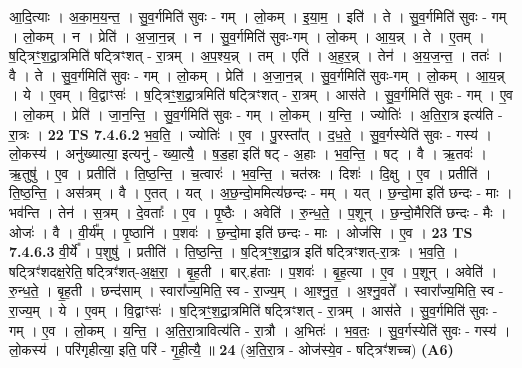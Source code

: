\documentclass[17pt]{extarticle}
\begin{document}
                  आ॒दि॒त्याः । अ॒का॒म॒य॒न्त॒ । सु॒व॒र्गमिति॑ सुवः - गम् । लो॒कम् । इ॒या॒म॒ । इति॑ । ते । सु॒व॒र्गमिति॑ सुवः - गम् । लो॒कम् । न । प्रेति॑ । अ॒जा॒न॒न्न् । न । सु॒व॒र्गमिति॑ सुवः-गम् । लो॒कम् । आ॒य॒न्न् । ते । ए॒तम् । ष॒ट्त्रिꣳ॒॒श॒द्रा॒त्रमिति॑ षट्त्रिꣳशत् - रा॒त्रम् । अ॒प॒श्य॒न्न् । तम् । एति॑ । अ॒ह॒र॒न्न् । तेन॑ । अ॒य॒ज॒न्त॒ । ततः॑ । वै । ते । सु॒व॒र्गमिति॑ सुवः - गम् । लो॒कम् । प्रेति॑ । अ॒जा॒न॒न्न् । सु॒व॒र्गमिति॑ सुवः-गम् । लो॒कम् । आ॒य॒न्न् । ये । ए॒वम् । वि॒द्वाꣳसः॑ । ष॒ट्त्रिꣳ॒॒श॒द्रा॒त्रमिति॑ षट्त्रिꣳशत् - रा॒त्रम् । आस॑ते । सु॒व॒र्गमिति॑ सुवः - गम् । ए॒व । लो॒कम् । प्रेति॑ । जा॒न॒न्ति॒ । सु॒व॒र्गमिति॑ सुवः - गम् । लो॒कम् । य॒न्ति॒ । ज्योतिः॑ । अ॒ति॒रा॒त्र इत्य॑ति - रा॒त्रः । \textbf{  22} \newline
                  \newline
                                \textbf{ TS 7.4.6.2} \newline
                  भ॒व॒ति॒ । ज्योतिः॑ । ए॒व । पु॒रस्ता᳚त् । द॒ध॒ते॒ । सु॒व॒र्गस्येति॑ सुवः - गस्य॑ । लो॒कस्य॑ । अनु॑ख्यात्या॒ इत्यनु॑ - ख्या॒त्यै॒ । ष॒ड॒हा इति॑ षट् - अ॒हाः । भ॒व॒न्ति॒ । षट् । वै । ऋ॒तवः॑ । ऋ॒तुषु॑ । ए॒व । प्रतीति॑ । ति॒ष्ठ॒न्ति॒ । च॒त्वारः॑ । भ॒व॒न्ति॒ । चत॑स्रः । दिशः॑ । दि॒क्षु । ए॒व । प्रतीति॑ । ति॒ष्ठ॒न्ति॒ । अस॑त्रम् । वै । ए॒तत् । यत् । अ॒छ॒न्दो॒ममित्य॑छन्दः - मम् । यत् । छ॒न्दो॒मा इति॑ छन्दः - माः । भव॑न्ति । तेन॑ । स॒त्रम् । दे॒वताः᳚ । ए॒व । पृ॒ष्ठैः । अवेति॑ । रु॒न्ध॒ते॒ । प॒शून् । छ॒न्दो॒मैरिति॑ छन्दः - मैः । ओजः॑ । वै । वी॒र्य᳚म् । पृ॒ष्ठानि॑ । प॒शवः॑ । छ॒न्दो॒मा इति॑ छन्दः - माः । ओज॑सि । ए॒व । \textbf{  23} \newline
                  \newline
                                \textbf{ TS 7.4.6.3} \newline
                  वी॒र्ये᳚ । प॒शुषु॑ । प्रतीति॑ । ति॒ष्ठ॒न्ति॒ । ष॒ट्त्रिꣳ॒॒श॒द्रा॒त्र इति॑ षट्त्रिꣳशत्-रा॒त्रः । भ॒व॒ति॒ । षट्त्रिꣳ॑शदक्ष॒रेति॒ षट्त्रिꣳ॑शत्-अ॒क्ष॒रा॒ । बृ॒ह॒ती । बार्.ह॑ताः । प॒शवः॑ । बृ॒ह॒त्या । ए॒व । प॒शून् । अवेति॑ । रु॒न्ध॒ते॒ । बृ॒ह॒ती । छन्द॑साम् । स्वारा᳚ज्य॒मिति॒ स्व - रा॒ज्य॒म् । आ॒श्नु॒त॒ । अ॒श्नु॒वते᳚ । स्वारा᳚ज्य॒मिति॒ स्व - रा॒ज्य॒म् । ये । ए॒वम् । वि॒द्वाꣳसः॑ । ष॒ट्त्रिꣳ॒॒श॒द्रा॒त्रमिति॑ षट्त्रिꣳशत् - रा॒त्रम् । आस॑ते । सु॒व॒र्गमिति॑ सुवः - गम् । ए॒व । लो॒कम् । य॒न्ति॒ । अ॒ति॒रा॒त्रावित्य॑ति - रा॒त्रौ । अ॒भितः॑ । भ॒व॒तः॒ । सु॒व॒र्गस्येति॑ सुवः - गस्य॑ । लो॒कस्य॑ । परि॑गृहीत्या॒ इति॒ परि॑ - गृ॒ही॒त्यै॒ ॥ \textbf{  24} \newline
                  \newline
                      (अ॒ति॒रा॒त्र - ओज॑स्ये॒व - षट्त्रिꣳ॑शच्च)  \textbf{(A6)} \newline \newline
\end{document}
